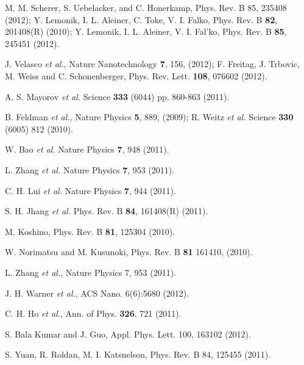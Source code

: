 \documentclass[twocolumn,prb,showpacs,preprintnumbers,amsmath,amssymb]{revtex4}
\begin{document}
\begin{thebibliography}{99}
M. M. Scherer, S. Uebelacker, and C. Honerkamp, 
Phys. Rev. B 85, 235408 (2012);
Y. Lemonik, I. L. Aleiner, C. Toke, V. I. Falko, Phys. Rev. B {\bf 82}, 201408(R) (2010);
Y. Lemonik, I. L. Aleiner, V. I. Fal'ko, Phys. Rev. B {\bf 85}, 245451 (2012).



             
J. Velasco {\em et al.}, Nature Nanotechnology {\bf 7}, 156, (2012);
F. Freitag, J. Trbovic, M. Weiss and C. Schonenberger, Phys. Rev. Lett. {\bf 108}, 076602 (2012).


A. S. Mayorov {\em et al.}	Science {\bf 333} (6044) pp. 860-863 (2011).


B. Feldman {\em et al.}, Nature Physics {\bf 5}, 889, (2009);
R. Weitz {\em et al.} Science {\bf 330} (6005)  812 (2010).




    W. Bao {\em et al.}  Nature Physics  {\bf 7},  948 (2011).
    
L. Zhang {\em et al.}      Nature Physics  {\bf 7}, 953 (2011).
    
    C. H. Lui {\em et al.}  Nature Physics  {\bf 7},  944 (2011).
                    


S. H. Jhang {\em et al.} Phys. Rev. B {\bf 84}, 161408(R) (2011).

M. Koshino,
Phys. Rev. B {\bf 81}, 125304 (2010).

W. Norimatsu and M. Kusunoki, Phys. Rev. B {\bf 81} 161410, (2010).

L. Zhang {\em et al.},    Nature Physics    7,    953    (2011).

J. H. Warner {\em et al.}, 
ACS Nano. 6(6):5680 (2012).

C. H. Ho {\em et al.},
Ann. of Phys. {\bf 326}, 721 (2011).

 S. Bala Kumar and J. Guo, 
 Appl. Phys. Lett. 100, 163102 (2012).

S. Yuan, R. Roldan, M. I. Katsnelson,
Phys. Rev. B 84, 125455 (2011).


\end{thebibliography}
\end{document}
